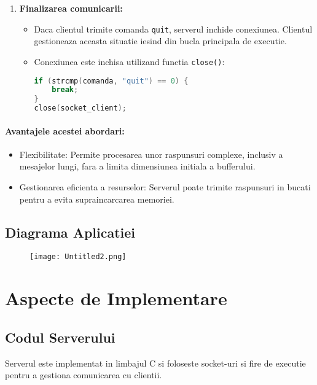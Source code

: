 \documentclass[runningheads]{llncs}
\begin{document}
\begin{enumerate}[label=\alph*)]
    \item \textbf{Finalizarea comunicarii:}
    \begin{itemize}
        \item Daca clientul trimite comanda \texttt{quit}, serverul inchide conexiunea. Clientul gestioneaza aceasta situatie iesind din bucla principala de executie.
        \item Conexiunea este inchisa utilizand functia \texttt{close()}:
        \begin{lstlisting}[language=C, basicstyle=\ttfamily\small]
if (strcmp(comanda, "quit") == 0) {
    break;
}
close(socket_client);
        \end{lstlisting}
    \end{itemize}
\end{enumerate}

\paragraph{Avantajele acestei abordari:}
\begin{itemize}
    \item Flexibilitate: Permite procesarea unor raspunsuri complexe, inclusiv a mesajelor lungi, fara a limita dimensiunea initiala a bufferului.
    \item Gestionarea eficienta a resurselor: Serverul poate trimite raspunsuri in bucati pentru a evita supraincarcarea memoriei.
\end{itemize}


\subsection{Diagrama Aplicatiei}
\vspace{-10pt}
\begin{figure}[H]
    \centering
    \texttt{[image: Untitled2.png]}
    \label{fig:enter-label}
\end{figure}
\section{Aspecte de Implementare}

\subsection{Codul Serverului}
Serverul este implementat in limbajul C si foloseste socket-uri si fire de executie pentru a gestiona comunicarea cu clientii.
\end{document}
